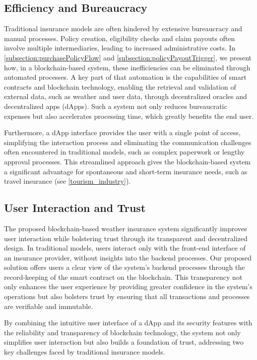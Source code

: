 \subsection{Efficiency and Bureaucracy}\label{efficiency_bureaucracy}
Traditional insurance models are often hindered by extensive bureaucracy and manual processes. Policy creation, eligibility checks and claim payouts often involve multiple intermediaries, leading to increased administrative costs. In \cref{subsection:purchasePolicyFlow} and \cref{subsection:policyPayoutTrigger}, we present how, in a blockchain-based system, these inefficiencies can be eliminated through automated processes. A key part of that automation is the capabilities of smart contracts and blockchain technology, enabling the retrieval and validation of external data, such as weather and user data, through decentralized oracles and decentralized apps (dApps). Such a system not only reduces bureaucratic expenses but also accelerates processing time, which greatly benefits the end user.

Furthermore, a dApp interface provides the user with a single point of access, simplifying the interaction process and eliminating the communication challenges often encountered in traditional models, such as complex paperwork or lengthy approval processes. This streamlined approach gives the blockchain-based system a significant advantage for spontaneous and short-term insurance needs, such as travel insurance (see \cref{tourism_industry}).

\subsection{User Interaction and Trust}\label{user_interaction_and_trust}
The proposed blockchain-based weather insurance system significantly improves user interaction while bolstering trust through its transparent and decentralized design. In traditional models, users interact only with the front-end interface of an insurance provider, without insights into the backend processes. Our proposed solution offers users a clear view of the system's backend processes through the record-keeping of the smart contract on the blockchain. This transparency not only enhances the user experience by providing greater confidence in the system's operations but also bolsters trust by ensuring that all transactions and processes are verifiable and immutable.

By combining the intuitive user interface of a dApp and its security features with the reliability and transparency of blockchain technology, the system not only simplifies user interaction but also builds a foundation of trust, addressing two key challenges faced by traditional insurance models.

